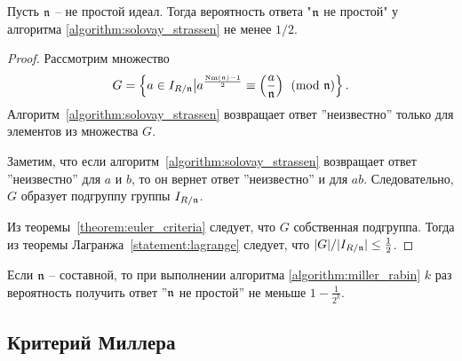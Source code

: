 \documentclass[_00_dissertation.tex]{subfiles}
\begin{document}
\begin{proposition}
    Пусть $\mathfrak{n}$ -- не простой идеал.
    Тогда вероятность ответа "$\mathfrak{n}$ не простой" у алгоритма \ref{algorithm:solovay_strassen} не менее $1/2$.
\end{proposition}
\begin{proof}
    Рассмотрим множество
    \begin{equation*}
        G = \left\{
            a \in I_{R/\mathfrak{n}} \big| a^{\frac{\textrm{Nm}(\mathfrak{n}) - 1}{2}} \equiv \left(\frac{a}{\mathfrak{n}}\right) \pmod{\mathfrak{n}}
        \right\}.
    \end{equation*}
    Алгоритм~\ref{algorithm:solovay_strassen} возвращает ответ ''неизвестно'' только для элементов из множества $G$.

    Заметим, что если алгоритм~\ref{algorithm:solovay_strassen} возвращает ответ ''неизвестно'' для $a$ и $b$, то он вернет ответ ''неизвестно'' и для $ab$.
    Следовательно, $G$ образует подгруппу группы $I_{R/\mathfrak{n}}$.

    Из теоремы~\ref{theorem:euler_criteria} следует, что $G$ собственная подгруппа.
    Тогда из теоремы Лагранжа~\ref{statement:lagrange} следует, что $|G|/|I_{R/\mathfrak{n}}| \le \frac{1}{2}$.
\end{proof}

\begin{remark}
    Если $\mathfrak{n}$ -- составной, то при выполнении алгоритма \ref{algorithm:miller_rabin} $k$ раз вероятность получить ответ ''$\mathfrak{n}$ не простой'' не меньше $1 - \frac{1}{2^k}$.
\end{remark}

\subsection{Критерий Миллера}
\end{document}
